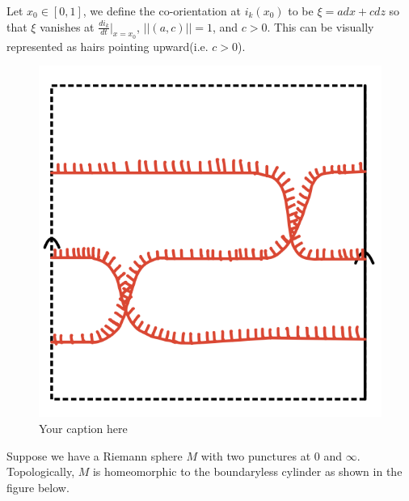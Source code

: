 Let $x_0 \in [0,1]$, we define the co-orientation at $i_k(x_0)$ to be $\xi = adx + cdz$ so that $\xi$ vanishes at $\frac{di_k}{dt}|_{x=x_0}$, $||(a,c)||= 1$, and $c>0$. This can be visually represented as hairs pointing upward(i.e. $c>0$).

\begin{figure}[H] 
    \centering
    \includegraphics[scale = 0.95]{diagrams/natural_alternating_diagrams/2.png} 
    \caption{Your caption here}
    \label{fig:your-label}
\end{figure}

Suppose we have a Riemann sphere $M$ with two punctures at $0$ and $\infty$. Topologically, $M$ is homeomorphic to the boundaryless cylinder as shown in the figure below.


